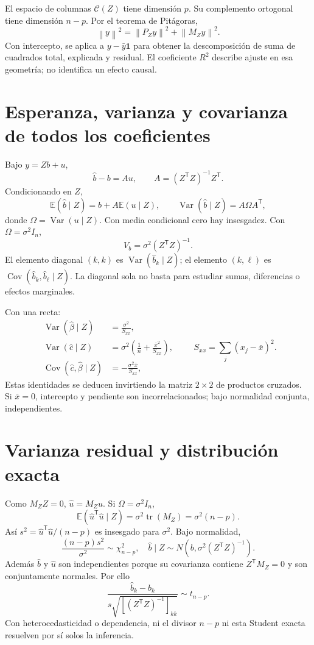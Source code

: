 \documentclass[11pt,a4paper]{article}
\newcommand{\E}{\mathbb E}
\newcommand{\T}{^{\mathsf T}}
\newcommand{\norm}[1]{\left\lVert #1\right\rVert}
\DeclareMathOperator{\Var}{Var}
\DeclareMathOperator{\Cov}{Cov}
\DeclareMathOperator{\tr}{tr}
\newcommand{\ones}{\mathbf 1}
\theoremstyle{definition}
\begin{document}
El espacio de columnas $\mathcal C(Z)$ tiene dimensión $p$. Su complemento ortogonal tiene dimensión $n-p$. Por el teorema de Pitágoras,
\[
\norm y^2=\norm{P_Zy}^2+\norm{M_Zy}^2.
\]
Con intercepto, se aplica a $y-\bar y\ones$ para obtener la descomposición de suma de cuadrados total, explicada y residual. El coeficiente $R^2$ describe ajuste en esa geometría; no identifica un efecto causal.

\section{Esperanza, varianza y covarianza de todos los coeficientes}
Bajo $y=Zb+u$,
\[
\widehat b-b=A u,\qquad A=(Z\T Z)^{-1}Z\T.
\]
Condicionando en $Z$,
\[
\E(\widehat b\mid Z)=b+A\E(u\mid Z),\qquad
\Var(\widehat b\mid Z)=A\Omega A\T,
\]
donde $\Omega=\Var(u\mid Z)$. Con media condicional cero hay insesgadez. Con $\Omega=\sigma^2I_n$,
\[
V_b=\sigma^2(Z\T Z)^{-1}.
\]
El elemento diagonal $(k,k)$ es $\Var(\widehat b_k\mid Z)$; el elemento $(k,\ell)$ es $\Cov(\widehat b_k,\widehat b_\ell\mid Z)$. La diagonal sola no basta para estudiar sumas, diferencias o efectos marginales.

Con una recta:
\[
\begin{aligned}
\Var(\widehat\beta\mid Z)&=\frac{\sigma^2}{S_{xx}},\\
\Var(\widehat c\mid Z)&=\sigma^2\left(\frac1n+\frac{\bar x^2}{S_{xx}}\right),\\
\Cov(\widehat c,\widehat\beta\mid Z)&=-\frac{\sigma^2\bar x}{S_{xx}},
\end{aligned}
\qquad S_{xx}=\sum_j(x_j-\bar x)^2.
\]
Estas identidades se deducen invirtiendo la matriz $2\times2$ de productos cruzados. Si $\bar x=0$, intercepto y pendiente son incorrelacionados; bajo normalidad conjunta, independientes.

\section{Varianza residual y distribución exacta}
Como $M_ZZ=0$, $\widehat u=M_Zu$. Si $\Omega=\sigma^2I_n$,
\[
\E(\widehat u\T\widehat u\mid Z)
=\sigma^2\tr(M_Z)=\sigma^2(n-p).
\]
Así $s^2=\widehat u\T\widehat u/(n-p)$ es insesgado para $\sigma^2$. Bajo normalidad,
\[
\frac{(n-p)s^2}{\sigma^2}\sim\chi_{n-p}^2,
\quad
\widehat b\mid Z\sim N(b,\sigma^2(Z\T Z)^{-1}).
\]
Además $\widehat b$ y $\widehat u$ son independientes porque su covarianza contiene $Z\T M_Z=0$ y son conjuntamente normales. Por ello
\[
\frac{\widehat b_k-b_k}{s\sqrt{[(Z\T Z)^{-1}]_{kk}}}\sim t_{n-p}.
\]
Con heterocedasticidad o dependencia, ni el divisor $n-p$ ni esta Student exacta resuelven por sí solos la inferencia.
\end{document}
